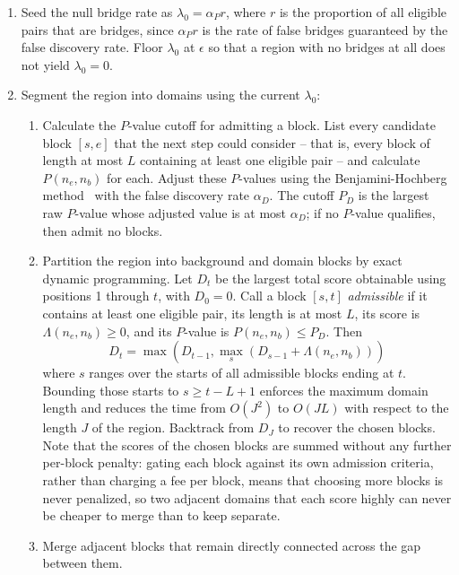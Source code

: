 \documentclass{article}
\begin{document}
\begin{enumerate}
    \item Seed the null bridge rate as $\lambda_0 = \alpha_P r$, where $r$ is the proportion of all eligible pairs that are bridges, since $\alpha_P r$ is the rate of false bridges guaranteed by the false discovery rate.
    Floor $\lambda_0$ at $\epsilon$ so that a region with no bridges at all does not yield $\lambda_0 = 0$.
    \item Segment the region into domains using the current $\lambda_0$:
    \begin{enumerate}
        \item Calculate the $P$-value cutoff for admitting a block.
        List every candidate block $[s, e]$ that the next step could consider -- that is, every block of length at most $L$ containing at least one eligible pair -- and calculate $P(n_e, n_b)$ for each.
        Adjust these $P$-values using the Benjamini-Hochberg method~\cite{Benjamini1995} with the false discovery rate $\alpha_D$.
        The cutoff $P_D$ is the largest raw $P$-value whose adjusted value is at most $\alpha_D$; if no $P$-value qualifies, then admit no blocks.
        \item Partition the region into background and domain blocks by exact dynamic programming.
        Let $D_t$ be the largest total score obtainable using positions 1 through $t$, with $D_0 = 0$.
        Call a block $[s, t]$ \textit{admissible} if it contains at least one eligible pair, its length is at most $L$, its score is $\Lambda(n_e, n_b) \ge 0$, and its $P$-value is $P(n_e, n_b) \le P_D$.
        Then
        \begin{equation}
            D_t = \max{\left(D_{t - 1}, \max_{s}{\left(D_{s - 1} + \Lambda(n_e, n_b)\right)}\right)}
        \end{equation}
        where $s$ ranges over the starts of all admissible blocks ending at $t$.
        Bounding those starts to $s \ge t - L + 1$ enforces the maximum domain length and reduces the time from $O(J^2)$ to $O(JL)$ with respect to the length $J$ of the region.
        Backtrack from $D_J$ to recover the chosen blocks.
        Note that the scores of the chosen blocks are summed without any further per-block penalty: gating each block against its own admission criteria, rather than charging a fee per block, means that choosing more blocks is never penalized, so two adjacent domains that each score highly can never be cheaper to merge than to keep separate.
        \item Merge adjacent blocks that remain directly connected across the gap between them.

\end{enumerate}
\end{enumerate}
\end{document}
